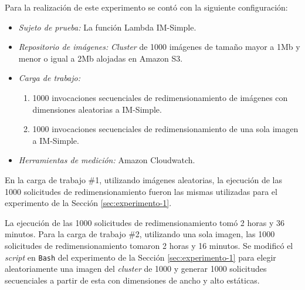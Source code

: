 Para la realización de este experimento se contó con la siguiente configuración:
\begin{itemize}
    \item \emph{Sujeto de prueba:} La función Lambda IM-Simple.
    \item \emph{Repositorio de imágenes:} \emph{Cluster} de 1000 imágenes de tamaño mayor a 1Mb y menor o igual a 2Mb alojadas en Amazon S3.
    \item \emph{Carga de trabajo:} 
    \begin{enumerate}
        \item 1000 invocaciones secuenciales de redimensionamiento de imágenes con dimensiones aleatorias a IM-Simple.
        \item 1000 invocaciones secuenciales de redimensionamiento de una sola imagen a IM-Simple.
    \end{enumerate}
    \item \emph{Herramientas de medición:} Amazon Cloudwatch.
\end{itemize}

En la carga de trabajo \#1, utilizando imágenes aleatorias, la ejecución de las 1000 solicitudes de redimensionamiento fueron las mismas utilizadas para el experimento de la Sección \ref{sec:experimento-1}. 

La ejecución de las 1000 solicitudes de redimensionamiento tomó 2 horas y 36 minutos. Para la carga de trabajo \#2, utilizando una sola imagen, las 1000 solicitudes de redimensionamiento tomaron 2 horas y 16 minutos. Se modificó el \emph{script} en \texttt{Bash} del experimento de la Sección \ref{sec:experimento-1} para elegir aleatoriamente una imagen del \emph{cluster} de 1000 y generar 1000 solicitudes secuenciales a partir de esta con dimensiones de ancho y alto estáticas.


